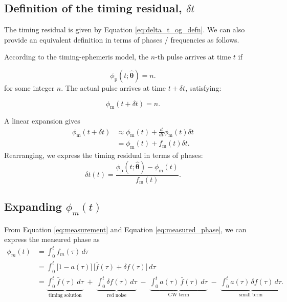 \documentclass[]{scrartcl}
\begin{document}
\subsection{Definition of the timing residual, $\delta t$}
The timing residual is given by Equation \eqref{eq:delta_t_og_defn}. We can also provide an equivalent definition in terms of phases / frequencies as follows. \newline 

\noindent According to the timing-ephemeris model, the $n$-th pulse arrives at time $t$ if 

\begin{equation}
	\phi_{\text{p}}(t; \boldsymbol{\hat{\theta}}) = n.
	\end{equation}
for some integer $n$. The actual pulse arrives at time $t + \delta t$, satisfying:

\begin{equation}
	\phi_{\text{m}}(t + \delta t) = n.
\end{equation}

\noindent A linear expansion gives
\begin{align}
	\phi_{\text{m}}(t + \delta t)  &\approx \phi_{\text{m}}(t) + \frac{d}{dt} \phi_{\text{m}}(t) \delta t \nonumber \\
	&= \phi_{\text{m}}(t) + f_{\text{m}}(t) \delta t. \label{eq:assumption 1}
\end{align}
Rearranging, we express the timing residual in terms of phases:
\begin{equation}
	\delta t (t)= \frac{\phi_{\text{p}}(t; \boldsymbol{\hat{\theta}}) - \phi_{\text{m}}(t)}{f_{\text{m}}(t)}. \label{eq:delta_t}
\end{equation}


\subsection{Expanding $\phi_m(t)$}
From Equation \eqref{eq:measurement} and Equation \eqref{eq:measured_phase}, we can express the measured phase as
\begin{align}
	\phi_m(t)
	&= \int_{0}^{t} f_m(\tau)\,d\tau \\
	&= \int_{0}^{t} 
	\bigl[1 - a(\tau)\bigr]\,
	\bigl[\bar{f}(\tau) + \delta f(\tau)\bigr]\,d\tau \\
	&= \underbrace{\int_{0}^{t} \bar{f}(\tau)\,d\tau}_{\text{timing solution}}
	\;+\;
	\underbrace{\int_{0}^{t} \delta f(\tau)\,d\tau}_{\text{red noise}}
	\;-\;
	\underbrace{\int_{0}^{t} a(\tau)\,\bar{f}(\tau)\,d\tau}_{\text{GW term}}
	\;-\;
	\underbrace{\int_{0}^{t} a(\tau)\,\delta f(\tau)\,d\tau}_{\text{small term}}. \label{eq:phi_m_decomposed}
\end{align}
\end{document}

